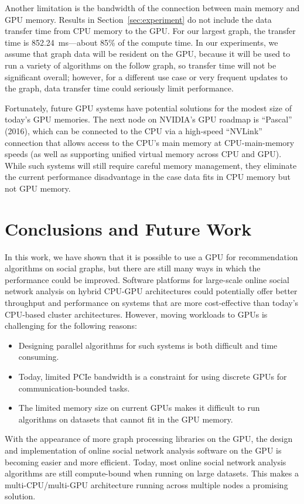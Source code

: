 \documentclass{article}
\begin{document}
Another limitation is the bandwidth of the connection between main memory and GPU memory. Results in Section~\ref{sec:experiment} do not include the data transfer time from CPU memory to the GPU\@. For our largest graph, the transfer time is 852.24~ms---about 85\% of the compute time. In our experiments, we assume that graph data will be resident on the GPU, because it will be used to run a variety of algorithms on the follow graph, so transfer time will not be significant overall; however, for a different use case or very frequent updates to the graph, data transfer time could seriously limit performance.

Fortunately, future GPU systems have potential solutions for the modest size of today's GPU memories. The next node on NVIDIA's GPU roadmap is ``Pascal'' (2016), which can be connected to the CPU via a high-speed ``NVLink'' connection that allows access to the CPU's main memory at CPU-main-memory speeds (as well as supporting unified virtual memory across CPU and GPU\@). While such systems will still require careful memory management, they eliminate the current performance disadvantage in the case data fits in CPU memory but not GPU memory.

\section{Conclusions and Future Work} In this work, we have shown that it
is possible to use a GPU for recommendation algorithms on social graphs, but there are still many ways in which the performance could be improved. Software platforms for large-scale online social network analysis on hybrid CPU-GPU architectures could potentially offer better throughput and performance on systems that are more cost-effective than today's CPU-based cluster architectures. However, moving workloads to GPUs is challenging for the following reasons:

\begin{itemize}
	\item Designing parallel algorithms for such systems is both difficult and time consuming.
	\item Today, limited PCIe bandwidth is a constraint for using discrete GPUs for communication-bounded tasks.
	\item The limited memory size on current GPUs makes it difficult to run algorithms on datasets that cannot fit in the GPU memory.
\end{itemize}

With the appearance of more graph processing libraries on the GPU, the design and implementation of online social network analysis software on the GPU is becoming easier and more efficient. Today, most online social network analysis algorithms are still compute-bound when running on large datasets. This makes a multi-CPU/multi-GPU architecture running across multiple nodes a promising solution.
\end{document}
